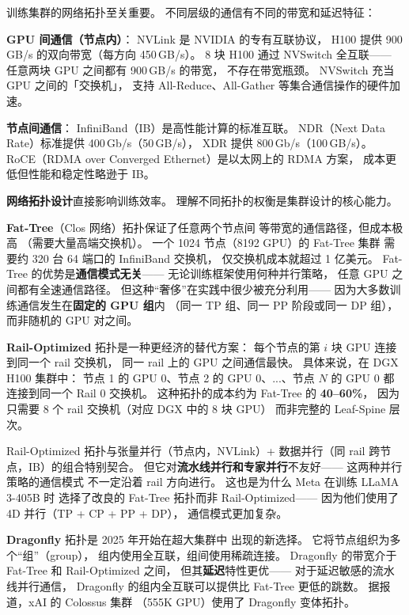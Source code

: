 训练集群的网络拓扑至关重要。
不同层级的通信有不同的带宽和延迟特征：

\textbf{GPU 间通信（节点内）}：
NVLink 是 NVIDIA 的专有互联协议，
H100 提供 900\,GB/s 的双向带宽（每方向 450\,GB/s）。
8 块 H100 通过 NVSwitch 全互联——
任意两块 GPU 之间都有 900\,GB/s 的带宽，
不存在带宽瓶颈。
NVSwitch 充当 GPU 之间的「交换机」，
支持 All-Reduce、All-Gather 等集合通信操作的硬件加速。

\textbf{节点间通信}：
InfiniBand（IB）是高性能计算的标准互联。
NDR（Next Data Rate）标准提供 400\,Gb/s（50\,GB/s），
XDR 提供 800\,Gb/s（100\,GB/s）。
RoCE（RDMA over Converged Ethernet）是以太网上的 RDMA 方案，
成本更低但性能和稳定性略逊于 IB。

\textbf{网络拓扑设计}直接影响训练效率。
理解不同拓扑的权衡是集群设计的核心能力。

\textbf{Fat-Tree}（Clos 网络）拓扑保证了任意两个节点间
等带宽的通信路径，但成本极高
（需要大量高端交换机）。
一个 1024 节点（8192 GPU）的 Fat-Tree 集群
需要约 320 台 64 端口的 InfiniBand 交换机，
仅交换机成本就超过 1 亿美元。
Fat-Tree 的优势是\textbf{通信模式无关}——
无论训练框架使用何种并行策略，
任意 GPU 之间都有全速通信路径。
但这种``奢侈''在实践中很少被充分利用——
因为大多数训练通信发生在\textbf{固定的 GPU 组}内
（同一 TP 组、同一 PP 阶段或同一 DP 组），
而非随机的 GPU 对之间。

\textbf{Rail-Optimized} 拓扑是一种更经济的替代方案：
每个节点的第 $i$ 块 GPU 连接到同一个 rail 交换机，
同一 rail 上的 GPU 之间通信最快。
具体来说，在 DGX H100 集群中：
节点 1 的 GPU 0、节点 2 的 GPU 0、...、节点 $N$ 的 GPU 0
都连接到同一个 Rail 0 交换机。
这种拓扑的成本约为 Fat-Tree 的 \textbf{40--60\%}，
因为只需要 8 个 rail 交换机（对应 DGX 中的 8 块 GPU）
而非完整的 Leaf-Spine 层次。

Rail-Optimized 拓扑与张量并行（节点内，NVLink）+
数据并行（同 rail 跨节点，IB）的组合特别契合。
但它对\textbf{流水线并行和专家并行}不友好——
这两种并行策略的通信模式
不一定沿着 rail 方向进行。
这也是为什么 Meta 在训练 LLaMA 3-405B 时
选择了改良的 Fat-Tree 拓扑而非 Rail-Optimized——
因为他们使用了 4D 并行（TP + CP + PP + DP），
通信模式更加复杂。

\textbf{Dragonfly} 拓扑是 2025 年开始在超大集群中
出现的新选择。
它将节点组织为多个``组''（group），
组内使用全互联，组间使用稀疏连接。
Dragonfly 的带宽介于 Fat-Tree 和 Rail-Optimized 之间，
但其\textbf{延迟}特性更优——
对于延迟敏感的流水线并行通信，
Dragonfly 的组内全互联可以提供比 Fat-Tree 更低的跳数。
据报道，xAI 的 Colossus 集群
（555K GPU）使用了 Dragonfly 变体拓扑。

